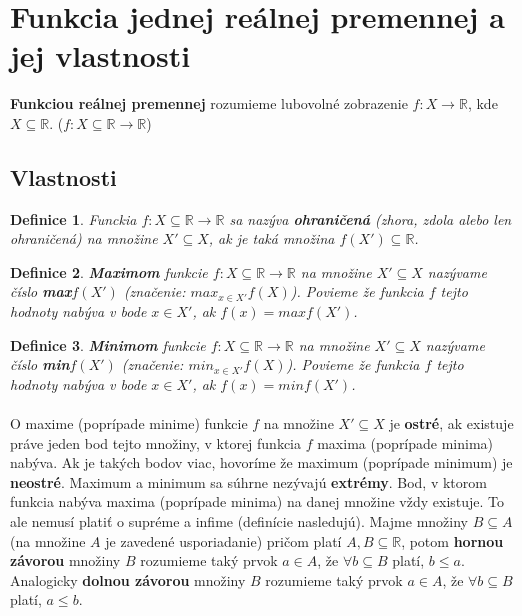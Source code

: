 \documentclass[12pt,a4paper]{article}
\newtheorem{definition}{Definice}
\begin{document}
\section{Funkcia jednej reálnej premennej a jej vlastnosti}
\textbf{Funkciou reálnej premennej} rozumieme lubovolné zobrazenie $f : X \rightarrow \mathds{R}$, kde $X \subseteq \mathds{R}$. ($f: X \subseteq \mathds{R} \rightarrow \mathds{R}$)

\subsection{Vlastnosti}
\begin{definition}
	Funckia $f: X \subseteq \mathds{R} \rightarrow \mathds{R}$ sa nazýva \textbf{ohraničená} (zhora, zdola alebo len ohraničená) na množine $X'\subseteq X$, ak je taká množina $f(X')\subseteq \mathds{R}$.
\end{definition}

\begin{definition}
	\textbf{Maximom} funkcie $f: X \subseteq \mathds{R} \rightarrow \mathds{R}$ na množine $X'\subseteq X$ nazývame číslo \textbf{max}$f(X')$ (značenie: $max_{x\in X'}f(X)$). Povieme že funkcia $f$ tejto hodnoty nabýva v bode $x\in X'$, ak $f(x)=max f(X')$.
\end{definition}

\begin{definition}
	\textbf{Minimom} funkcie $f: X \subseteq \mathds{R} \rightarrow \mathds{R}$ na množine $X'\subseteq X$ nazývame číslo \textbf{min}$f(X')$ (značenie: $min_{x\in X'}f(X)$). Povieme že funkcia $f$ tejto hodnoty nabýva v bode $x\in X'$, ak $f(x)=min f(X')$.
\end{definition}

\paragraph{} 
O maxime (poprípade minime) funkcie $f$ na množine $X'\subseteq X$ je \textbf{ostré}, ak existuje práve jeden bod tejto množiny, v ktorej funkcia $f$ maxima (poprípade minima) nabýva. Ak je takých bodov viac, hovoríme že maximum (poprípade minimum) je \textbf{neostré}. Maximum a minimum sa súhrne nezývajú \textbf{extrémy}. Bod, v ktorom funkcia nabýva maxima (poprípade minima) na danej množine vždy existuje. To ale nemusí platiť o supréme a infime (definície nasledujú). Majme množiny $B \subseteq A$ (na množine $A$ je zavedené usporiadanie) pričom platí $A, B \subseteq \mathds{R}$, potom \textbf{hornou závorou} množiny $B$ rozumieme taký prvok $a\in A$, že $\forall b\subseteq B$ platí, $b\leq a$. Analogicky \textbf{dolnou závorou} množiny $B$ rozumieme taký prvok $a\in A$, že $\forall b\subseteq B$ platí, $a\leq b$. \vspace{0.5cm}
\end{document}
